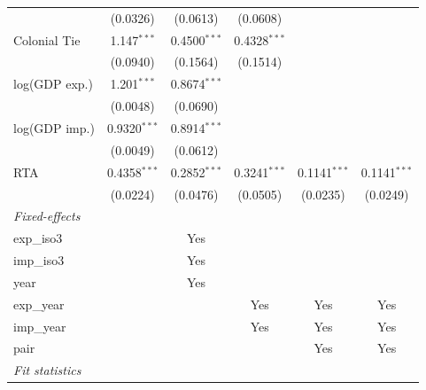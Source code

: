 \begin{table}[htbp]
\begin{tabular}{lccccc}
                          & (0.0326)       & (0.0613)              & (0.0608)              &                       &   \\   
      Colonial Tie        & 1.147$^{***}$  & 0.4500$^{***}$        & 0.4328$^{***}$        &                       &   \\   
                          & (0.0940)       & (0.1564)              & (0.1514)              &                       &   \\   
      log(GDP exp.)       & 1.201$^{***}$  & 0.8674$^{***}$        &                       &                       &   \\   
                          & (0.0048)       & (0.0690)              &                       &                       &   \\   
      log(GDP imp.)       & 0.9320$^{***}$ & 0.8914$^{***}$        &                       &                       &   \\   
                          & (0.0049)       & (0.0612)              &                       &                       &   \\   
      RTA                 & 0.4358$^{***}$ & 0.2852$^{***}$        & 0.3241$^{***}$        & 0.1141$^{***}$        & 0.1141$^{***}$\\   
                          & (0.0224)       & (0.0476)              & (0.0505)              & (0.0235)              & (0.0249)\\   
      \midrule
      \emph{Fixed-effects}\\
      exp\_iso3           &                & Yes                   &                       &                       & \\  
      imp\_iso3           &                & Yes                   &                       &                       & \\  
      year                &                & Yes                   &                       &                       & \\  
      exp\_year           &                &                       & Yes                   & Yes                   & Yes\\  
      imp\_year           &                &                       & Yes                   & Yes                   & Yes\\  
      pair                &                &                       &                       & Yes                   & Yes\\  
      \midrule
      \emph{Fit statistics}\\

\end{tabular}
\end{table}
